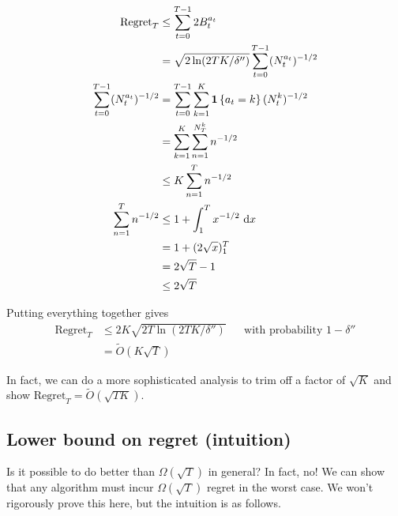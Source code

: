 \documentclass[\main/main]{subfiles}
\begin{document}
\begin{align*}
    \text{Regret}_T                     & \le \sum_{t=0}^{T-1} 2 B^{a_t}_t                                       \\
                                        & = \sqrt{2\ln(2TK/\delta'')} \sum_{t=0}^{T-1} (N^{a_t}_t)^{-1/2}        \\
    \sum_{t=0}^{T-1} (N^{a_t}_t)^{-1/2} & = \sum_{t=0}^{T-1} \sum_{k=1}^K \mathbf{1}\left\{ a_t = k \right\} (N^k_t)^{-1/2} \\
                                        & = \sum_{k=1}^K \sum_{n=1}^{N_T^k} n^{-1/2}                             \\
                                        & \le K \sum_{n=1}^T n^{-1/2}                                            \\
    \sum_{n=1}^T n^{-1/2}               & \le 1 + \int_1^T x^{-1/2} \ \mathrm{d}x                                \\
                                        & = 1 + (2 \sqrt{x})_1^T                                                 \\
                                        & = 2 \sqrt{T} - 1                                                       \\
                                        & \le 2 \sqrt{T}                                                         \\
\end{align*}

Putting everything together gives
\begin{align*}
    \text{Regret}_T & \le 2 K \sqrt{2T \ln(2TK/\delta'')} &  & \text{with probability } 1-\delta'' \\
                    & = \tilde O(K\sqrt{T})
\end{align*}


In fact, we can do a more sophisticated analysis to trim off a factor of $\sqrt{K}$ and show $\text{Regret}_T = \tilde O(\sqrt{TK})$.

\subsection{Lower bound on regret (intuition)}

Is it possible to do better than $\Omega(\sqrt{T})$ in general? In fact, no! We can show that any algorithm must incur $\Omega(\sqrt{T})$ regret in the worst case. We won't rigorously prove this here, but the intuition is as follows.
\end{document}
